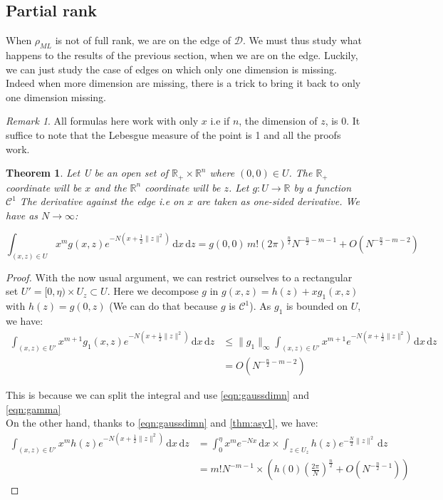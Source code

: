 \documentclass[10pt]{report}
\theoremstyle{plain}
\newtheorem{thm}{Theorem}[chapter]
\theoremstyle{definition}
\theoremstyle{remark}
\newtheorem*{rem}{Remark}
\newcommand{\R}{\ensuremath{\mathbb{R}}}
\newcommand{\dd}{\mathrm{d}}
\renewcommand{\leq}{\leqslant}
\newcommand{\class}[1]{{\mathscr{C}^{#1}}}
\newcommand{\ml}{_{M\!L}}
\begin{document}
\subsection{Partial rank}

When $\rho\ml$ is not of full rank, we are on the edge of $\mathcal{D}$. We must
thus study what happens to the results of the previous section, when we are on
the edge. Luckily, we can just study the case of edges on which only one
dimension is missing. Indeed when more dimension are missing, there is a trick
to bring it back to only one dimension missing.

\begin{rem}
All formulas here work
with only $x$ i.e if $n$, the dimension of $z$, is 0. It suffice to note that the
Lebesgue measure of the point is 1 and all the proofs work.
\end{rem}

\begin{thm}\label{thm:asyp1}
  Let U be an open set of $\R_+ \times \R^n$ where $(0,0) \in U$. The $\R_+$
  coordinate will be $x$ and the $\R^n$ coordinate will be $z$. Let $g : U \to
  \R$ by a function $\class 1$ The derivative against the edge i.e on $x$ are
  taken as one-sided derivative. We have as $N \to \infty$:

  \[\int_{(x,z) \in U} x^m g(x,z)e^{-N(x + \frac 12 \|z\|^2)} \,\dd x\, \dd z =
    g(0,0)\,m! {(2\pi)}^{\frac n 2} N^{-\frac n 2 - m - 1} + O(N^{-\frac n 2 - m - 2})\]
\end{thm}

\begin{proof} With the now usual argument, we can restrict ourselves to a
  rectangular set $U' = [0,\eta) \times U_z \subset U$.
  Here we decompose $g$ in $g(x,z) = h(z) + x g_1(x,z)$ with $h(z) = g(0,z)$ (We
  can do that because $g$ is $\class 1$). As
  $g_1$ is bounded on $U$, we have:
\begin{align*}
  \int_{(x,z) \in U'} x^{m+1}g_1(x,z)e^{-N(x + \frac 12 \|z\|^2)} \,\dd x\, \dd z
  &\leq
  \|g_1\|_\infty\int_{(x,z) \in U'} x^{m+1}e^{-N(x + \frac 12 \|z\|^2)} \,\dd x\, \dd z\\
    &=O(N^{-\frac n 2 - m - 2})
\end{align*}

This is because we can split the integral and use \cref{eqn:gaussdimn} and \cref{eqn:gamma}\\
On the other hand, thanks to \cref{eqn:gaussdimn} and \cref{thm:asy1}, we have:
\begin{align*}
  \int_{(x,z) \in U'} x^{m}h(z)e^{-N(x + \frac 12 \|z\|^2)} \,\dd x\, \dd z
  &= \int_0^\eta x^{m}e^{-Nx} \,\dd x \times
    \int_{z \in U_z} h(z)e^{-\frac N2 \|z\|^2} \, \dd z\\
  &= m! N^{-m-1} \times( h(0){\left(\frac
      {2\pi}{N}\right)}^{\frac n 2} +
    O\left({N^{-\frac n 2 -1}}\right))
\end{align*}

\end{proof}
\end{document}
